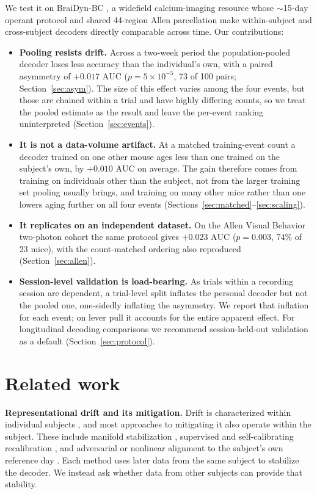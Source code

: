 \documentclass{article}
\newcommand{\auc}{\mathrm{AUC}}
\begin{document}
We test it on BraiDyn-BC \citep{kondo2025}, a widefield calcium-imaging resource whose $\sim$15-day
operant protocol and shared 44-region Allen parcellation make within-subject and cross-subject
decoders directly comparable across time. Our contributions:
\begin{itemize}\itemsep2pt
\item \textbf{Pooling resists drift.} Across a two-week period the population-pooled decoder loses
less accuracy than the individual's own, with a paired asymmetry of $+0.017$ $\auc$
($p = 5 \times 10^{-5}$, 73 of 100 pairs; Section~\ref{sec:asym}). The size of this effect varies
among the four events, but those are chained within a trial and have highly differing counts, so we
treat the pooled estimate as the result and leave the per-event ranking uninterpreted
(Section~\ref{sec:events}).
\item \textbf{It is not a data-volume artifact.} At a matched training-event count a decoder trained
on one other mouse ages less than one trained on the subject's own, by $+0.010$ $\auc$ on average.
The gain therefore comes from training on individuals other than the subject, not from the larger
training set pooling usually brings, and training on many other mice rather than one lowers aging
further on all four events (Sections~\ref{sec:matched}--\ref{sec:scaling}).
\item \textbf{It replicates on an independent dataset.} On the Allen Visual Behavior two-photon
cohort the same protocol gives $+0.023$ $\auc$ ($p = 0.003$, 74\% of 23 mice), with the
count-matched ordering also reproduced (Section~\ref{sec:allen}).
\item \textbf{Session-level validation is load-bearing.} As trials within a recording session are
dependent, a trial-level split inflates the personal decoder but not the pooled one, one-sidedly
inflating the asymmetry. We report that inflation for each event; on lever pull it accounts for the
entire apparent effect. For longitudinal decoding comparisons we recommend session-held-out
validation as a default (Section~\ref{sec:protocol}).
\end{itemize}

\section{Related work}
\textbf{Representational drift and its mitigation.} Drift is characterized within individual
subjects \citep{rule2020,driscoll2017,schoonover2021,rule2019}, and most approaches to mitigating it
also operate within the subject. These include manifold stabilization \citep{degenhart2020},
supervised and self-calibrating recalibration \citep{jarosiewicz2015,wilson2025}, and adversarial or
nonlinear alignment to the subject's own reference day \citep{farshchian2019,karpowicz2025}. Each
method uses later data from the same subject to stabilize the decoder. We instead ask whether data
from other subjects can provide that stability.
\end{document}
